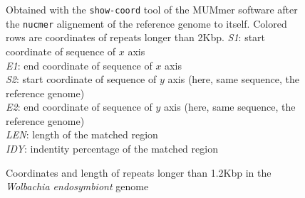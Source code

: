 \documentclass[12pt]{article}
\begin{document}
\begin{figure}[h!]
\caption{Coordinates and length of repeats longer than 1.2Kbp in the \textit{Wolbachia endosymbiont} genome}
\footnotesize Obtained with the \texttt{show-coord} tool of the MUMmer software after the \texttt{nucmer} alignement of the reference genome to itself. Colored rows are coordinates of repeats longer than 2Kbp.
\textit{\color{magenta} S1}: start coordinate of sequence of $x$ axis \\
\textit{\color{magenta} E1}: end coordinate of sequence of $x$ axis \\
\textit{\color{magenta} S2}: start coordinate of sequence of $y$ axis (here, same sequence, the reference genome)\\
\textit{\color{magenta} E2}: end coordinate of sequence of $y$ axis (here, same sequence, the reference genome)\\
\textit{\color{magenta} LEN}: length of the matched region \\
\textit{\color{magenta} IDY}: indentity percentage of the matched region \\

\label{tab:repeatcoord}


\end{figure}
\end{document}
